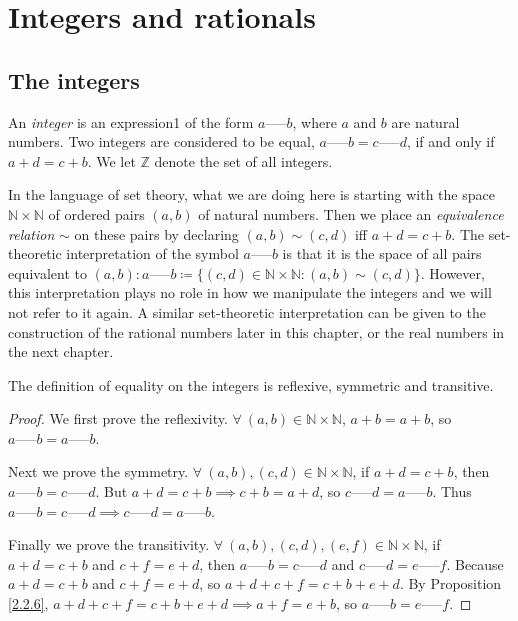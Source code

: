 \chapter{Integers and rationals}
\section{The integers}

\begin{definition}[Integers]\label{4.1.1}
An \emph{integer} is an expression1 of the form \(a \text{-----} b\), where \(a\) and \(b\) are natural numbers.
Two integers are considered to be equal, \(a \text{-----} b = c \text{-----} d\), if and only if \(a + d = c + b\).
We let \(\mathds{Z}\) denote the set of all integers.
\end{definition}

In the language of set theory, what we are doing here is starting with the space \(\mathds{N} \times \mathds{N}\) of ordered pairs \((a, b)\) of natural numbers.
Then we place an \emph{equivalence relation} \(\sim\) on these pairs by declaring \((a, b) \sim (c, d)\) iff \(a + d = c + b\).
The set-theoretic interpretation of the symbol \(a \text{-----} b\) is that it is the space of all pairs equivalent to \((a, b): a \text{-----} b \coloneqq \{(c, d) \in \mathds{N} \times \mathds{N} : (a, b) \sim (c, d)\}\).
However, this interpretation plays no role in how we manipulate the integers and we will not refer to it again.
A similar set-theoretic interpretation can be given to the construction of the rational numbers later in this chapter, or the real numbers in the next chapter.

\begin{additional corollary}\label{ac 4.1.1}
The definition of equality on the integers is reflexive, symmetric and transitive.
\end{additional corollary}

\begin{proof}
We first prove the reflexivity.
\(\forall\ (a, b) \in \mathds{N} \times \mathds{N}\), \(a + b = a + b\), so \(a \text{-----} b = a \text{-----} b\).

Next we prove the symmetry.
\(\forall\ (a, b), (c, d) \in \mathds{N} \times \mathds{N}\), if \(a + d = c + b\), then \(a \text{-----} b = c \text{-----} d\).
But \(a + d = c + b \implies c + b = a + d\), so \(c \text{-----} d = a \text{-----} b\).
Thus \(a \text{-----} b = c \text{-----} d \implies c \text{-----} d = a \text{-----} b\).

Finally we prove the transitivity.
\(\forall\ (a, b), (c, d), (e, f) \in \mathds{N} \times \mathds{N}\), if \(a + d = c + b\) and \(c + f = e + d\), then \(a \text{-----} b = c \text{-----} d\) and \(c \text{-----} d = e \text{-----} f\).
Because \(a + d = c + b\) and \(c + f = e + d\), so \(a + d + c + f = c + b + e + d\).
By Proposition \ref{2.2.6}, \(a + d + c + f = c + b + e + d \implies a + f = e + b\), so \(a \text{-----} b = e \text{-----} f\).
\end{proof}

